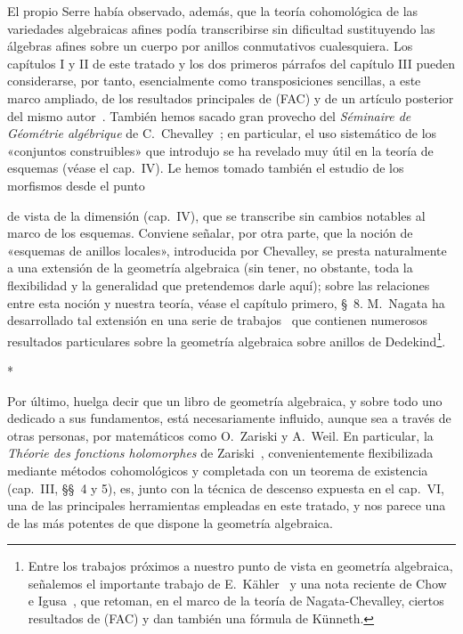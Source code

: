 El propio Serre había observado, además, que la teoría cohomológica de las variedades algebraicas afines podía transcribirse sin dificultad sustituyendo las álgebras afines sobre un cuerpo por anillos conmutativos cualesquiera.
Los capítulos I y II de este tratado y los dos primeros párrafos del capítulo III pueden considerarse, por tanto, esencialmente como transposiciones sencillas, a este marco ampliado, de los resultados principales de (FAC) y de un artículo posterior del mismo autor~\cite{I-15}.
También hemos sacado gran provecho del \emph{Séminaire de Géométrie algébrique} de C.~Chevalley~\cite{I-1}; en particular, el uso sistemático de los «conjuntos construibles» que introdujo se ha revelado muy útil en la teoría de esquemas (véase el cap.~IV).
Le hemos tomado también el estudio de los morfismos desde el punto

de vista de la dimensión (cap.~IV), que se transcribe sin cambios notables al marco de los esquemas.
Conviene señalar, por otra parte, que la noción de «esquemas de anillos locales», introducida por Chevalley, se presta naturalmente a una extensión de la geometría algebraica (sin tener, no obstante, toda la flexibilidad y la generalidad que pretendemos darle aquí); sobre las relaciones entre esta noción y nuestra teoría, véase el capítulo primero, \S~8.
M.~Nagata ha desarrollado tal extensión en una serie de trabajos~\cite{I-9} que contienen numerosos resultados particulares sobre la geometría algebraica sobre anillos de Dedekind\footnote{Entre los trabajos próximos a nuestro punto de vista en geometría algebraica, señalemos el importante trabajo de E.~Kähler~\cite{I-22} y una nota reciente de Chow e Igusa~\cite{I-3}, que retoman, en el marco de la teoría de Nagata-Chevalley, ciertos resultados de (FAC) y dan también una fórmula de Künneth.}.

\bigskip
\begin{center}*\quad*\quad*\end{center}
\bigskip

Por último, huelga decir que un libro de geometría algebraica, y sobre todo uno dedicado a sus fundamentos, está necesariamente influido, aunque sea a través de otras personas, por matemáticos como O.~Zariski y A.~Weil.
En particular, la \emph{Théorie des fonctions holomorphes} de Zariski~\cite{I-20}, convenientemente flexibilizada mediante métodos cohomológicos y completada con un teorema de existencia (cap.~III, \S\S~4 y 5), es, junto con la técnica de descenso expuesta en el cap.~VI, una de las principales herramientas empleadas en este tratado, y nos parece una de las más potentes de que dispone la geometría algebraica.

